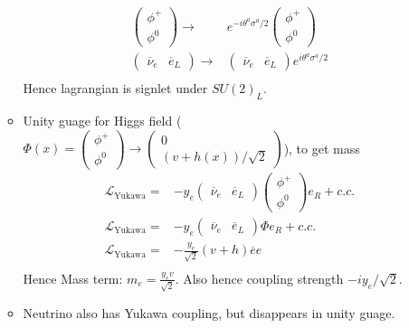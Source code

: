 \begin{itemize}
\begin{itemize}
        \begin{equation}\begin{split}
        \begin{pmatrix}\phi^+\\\phi^0\end{pmatrix}\to&e^{-i\theta^a\sigma^a/2}\begin{pmatrix}\phi^+\\\phi^0\end{pmatrix}\\
        \begin{pmatrix}\overline{\nu}_e&\overline{e}_L\end{pmatrix}\to&\begin{pmatrix}\overline{\nu}_e&\overline{e}_L\end{pmatrix}e^{i\theta^a\sigma^a/2} \\
        \end{split}\end{equation}
        Hence lagrangian is signlet under $SU(2)_L$.
        \item Unity guage for Higgs field ($\Phi(x)=\begin{pmatrix}\phi^+\\\phi^0\end{pmatrix}\to\begin{pmatrix}0\\(v+h(x))/\sqrt{2}\end{pmatrix}$), to get mass \cite{wells}
        \begin{equation}\begin{split}
        \mathcal{L}_{\text{Yukawa}}=&-y_e\begin{pmatrix}\overline{\nu}_e&\overline{e}_L\end{pmatrix}\begin{pmatrix}\phi^+\\\phi^0\end{pmatrix}e_R+c.c. \\
        \mathcal{L}_{\text{Yukawa}}=&-y_e\begin{pmatrix}\overline{\nu}_e&\overline{e}_L\end{pmatrix}\Phi e_R+c.c. \\
        \mathcal{L}_{\text{Yukawa}}=&-\frac{y_e}{\sqrt{2}}(v+h)\overline{e}e \\
        \end{split}\end{equation}
        Hence Mass term: $m_e=\frac{y_ev}{\sqrt{2}}$. Also hence coupling strength $-iy_e/\sqrt{2}$.
        \item Neutrino also has Yukawa coupling, but disappears in unity guage. \cite{wells}
    \end{itemize}
\end{itemize}

